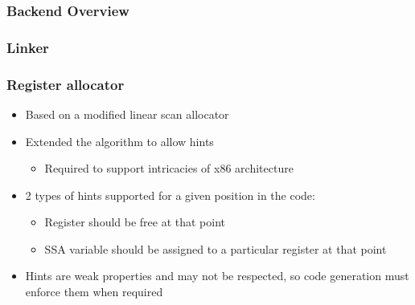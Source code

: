 \begin{frame}
\frametitle{\bf Backend Overview}

\end{frame}

\begin{frame}
\frametitle{\bf Linker}

\end{frame}

\begin{frame}
\frametitle{\bf Register allocator}

\begin{itemize}
    \item Based on a modified linear scan allocator
    \item Extended the algorithm to allow hints
    \begin{itemize}
        \item Required to support intricacies of x86 architecture
    \end{itemize}
    \item 2 types of hints supported for a given position in the code:
    \begin{itemize}
        \item Register should be free at that point
        \item SSA variable should be assigned to a particular register at that point
    \end{itemize}
    \item Hints are weak properties and may not be respected, so code generation must enforce
    them when required
\end{itemize}
\end{frame}

